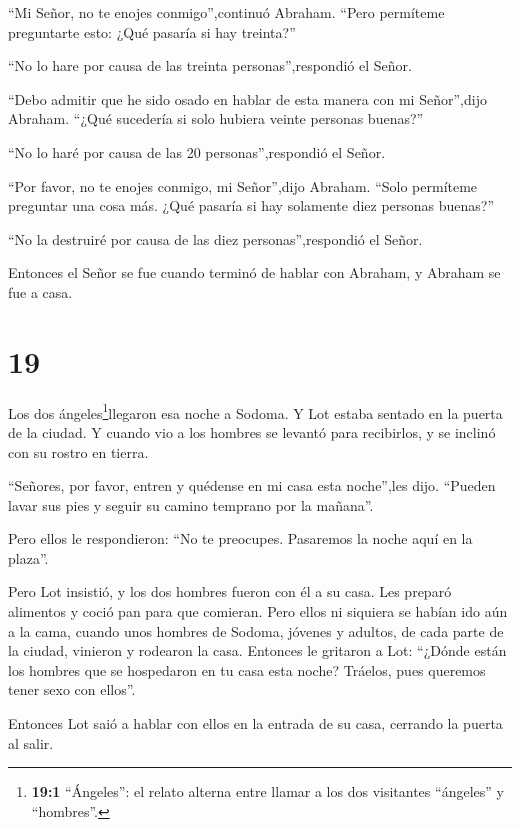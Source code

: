  ``Mi Señor, no te enojes conmigo'',continuó Abraham.
``Pero permíteme preguntarte esto: ¿Qué pasaría si hay treinta?''

``No lo hare por causa de las treinta personas'',respondió el Señor.

 ``Debo admitir que he sido osado en hablar de esta manera
con mi Señor'',dijo Abraham. ``¿Qué sucedería si solo hubiera veinte
personas buenas?''

``No lo haré por causa de las 20 personas'',respondió el Señor.

 ``Por favor, no te enojes conmigo, mi Señor'',dijo
Abraham. ``Solo permíteme preguntar una cosa más. ¿Qué pasaría si hay
solamente diez personas buenas?''

``No la destruiré por causa de las diez personas'',respondió el Señor.

 Entonces el Señor se fue cuando terminó de hablar con
Abraham, y Abraham se fue a casa.

\hypertarget{section-18}{%
\section{19}\label{section-18}}

 Los dos ángeles\footnote{\textbf{19:1} ``Ángeles'': el
  relato alterna entre llamar a los dos visitantes ``ángeles'' y
  ``hombres''.}llegaron esa noche a Sodoma. Y Lot estaba sentado en la
puerta de la ciudad. Y cuando vio a los hombres se levantó para
recibirlos, y se inclinó con su rostro en tierra.

 ``Señores, por favor, entren y quédense en mi casa esta
noche'',les dijo. ``Pueden lavar sus pies y seguir su camino temprano
por la mañana''.

Pero ellos le respondieron: ``No te preocupes. Pasaremos la noche aquí
en la plaza''.

 Pero Lot insistió, y los dos hombres fueron con él a su
casa. Les preparó alimentos y coció pan para que comieran. 
Pero ellos ni siquiera se habían ido aún a la cama, cuando unos hombres
de Sodoma, jóvenes y adultos, de cada parte de la ciudad, vinieron y
rodearon la casa.  Entonces le gritaron a Lot: ``¿Dónde
están los hombres que se hospedaron en tu casa esta noche? Tráelos, pues
queremos tener sexo con ellos''.

 Entonces Lot saió a hablar con ellos en la entrada de su
casa, cerrando la puerta al salir.

